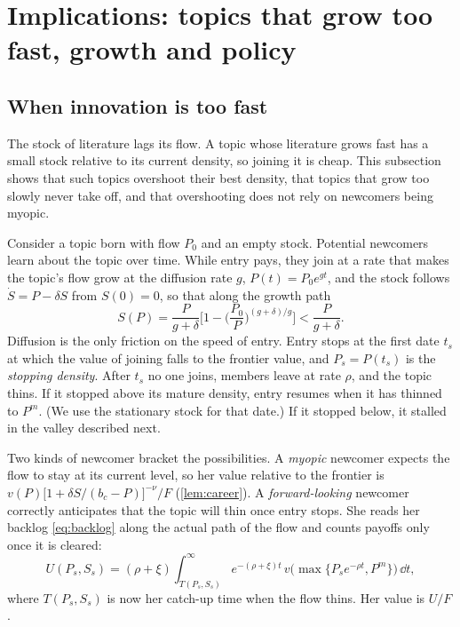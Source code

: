 \section{Implications: topics that grow too fast, growth and policy}\label{sec:macro}

\subsection{When innovation is too fast}

The stock of literature lags its flow. A topic whose literature grows fast has a
small stock relative to its current density, so joining it is cheap. This
subsection shows that such topics overshoot their best density, that topics
that grow too slowly never take off, and that overshooting does not rely on
newcomers being myopic.

Consider a topic born with flow $P_0$ and an empty stock. Potential newcomers
learn about the topic over time. While entry pays, they join at a rate that
makes the topic's flow grow at the diffusion rate $g$, $P(t)=P_0e^{gt}$, and the
stock follows $\dot S=P-\delta S$ from $S(0)=0$, so that along the growth path
\begin{equation}\label{eq:growthstock}
S(P)=\frac{P}{g+\delta}\Big[1-\Big(\frac{P_0}{P}\Big)^{(g+\delta)/g}\Big]<\frac{P}{g+\delta}.
\end{equation}
Diffusion is the only friction on the speed of entry. Entry stops at the first
date $t_s$ at which the value of joining falls to the frontier value, and
$P_s=P(t_s)$ is the \emph{stopping density}. After $t_s$ no one joins, members
leave at rate $\rho$, and the topic thins. If it stopped above its mature
density, entry resumes when it has thinned to $P^m$. (We use the stationary
stock for that date.) If it stopped below, it stalled in the valley described
next.

Two kinds of newcomer bracket the possibilities. A \emph{myopic} newcomer
expects the flow to stay at its current level, so her value relative to the
frontier is $v(P)\big[1+\delta S/(b_c-P)\big]^{-\nu}/F$ (\cref{lem:career}). A
\emph{forward-looking} newcomer correctly anticipates that the topic will thin
once entry stops. She reads her backlog \eqref{eq:backlog} along the actual
path of the flow and counts payoffs only once it is cleared:
\[
U(P_s,S_s)=(\rho+\xi)\int_{T(P_s,S_s)}^\infty e^{-(\rho+\xi)t}\,v\big(\max\{P_se^{-\rho t},P^m\}\big)\,\dd t,
\]
where $T(P_s,S_s)$ is now her catch-up time when the flow thins. Her value is
$U/F$.

